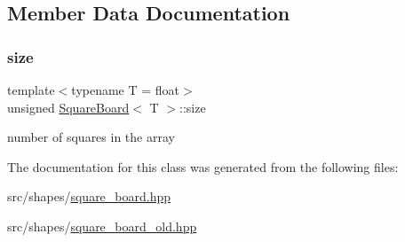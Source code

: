 \subsection{Member Data Documentation}
\mbox{\label{classSquareBoard_a92007159761cd4dfe85aaaa11103ea84}} 
\subsubsection{\texorpdfstring{size}{size}}
{\footnotesize\ttfamily template$<$typename T  = float$>$ \\
unsigned \mbox{\hyperlink{classSquareBoard}{Square\+Board}}$<$ T $>$\+::size\hspace{0.3cm}{\ttfamily [private]}}

number of squares in the array 

The documentation for this class was generated from the following files\+:\begin{DoxyCompactItemize}
\item 
src/shapes/\mbox{\hyperlink{square__board_8hpp}{square\+\_\+board.\+hpp}}\item 
src/shapes/\mbox{\hyperlink{square__board__old_8hpp}{square\+\_\+board\+\_\+old.\+hpp}}\end{DoxyCompactItemize}
